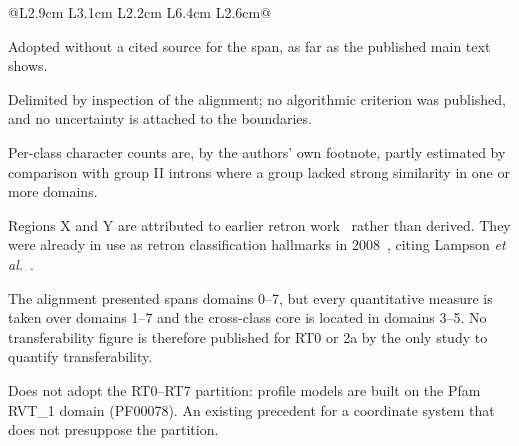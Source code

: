 \begin{table}
\begin{threeparttable}
\begin{tabular}{@{}L{2.9cm} L{3.1cm} L{2.2cm} L{6.4cm} L{2.6cm}@{}}
\bottomrule
\end{tabular}
\begin{tablenotes}[flushleft]\footnotesize
\item[$\ast$] Adopted without a cited source for the span, as far as the published main
  text shows.
\item[a] Delimited by inspection of the alignment; no algorithmic criterion was published,
  and no uncertainty is attached to the boundaries.
\item[b] Per-class character counts are, by the authors' own footnote, partly estimated by
  comparison with group II introns where a group lacked strong similarity in one or more
  domains.
\item[c] Regions X and Y are attributed to earlier retron work~\cite{simon2019} rather than
  derived. They were already in use as retron classification hallmarks in
  2008~\cite{simon2008}, citing Lampson \textit{et al.}~\cite{lampson2005}.
\item[d] The alignment presented spans domains 0--7, but every quantitative measure is
  taken over domains 1--7 and the cross-class core is located in domains 3--5. No
  transferability figure is therefore published for RT0 or 2a by the only study to
  quantify transferability.
\item[e] Does not adopt the RT0--RT7 partition: profile models are built on the Pfam
  RVT\_1 domain (PF00078). An existing precedent for a coordinate system that does not
  presuppose the partition.
\end{tablenotes}
\end{threeparttable}
\end{table}



